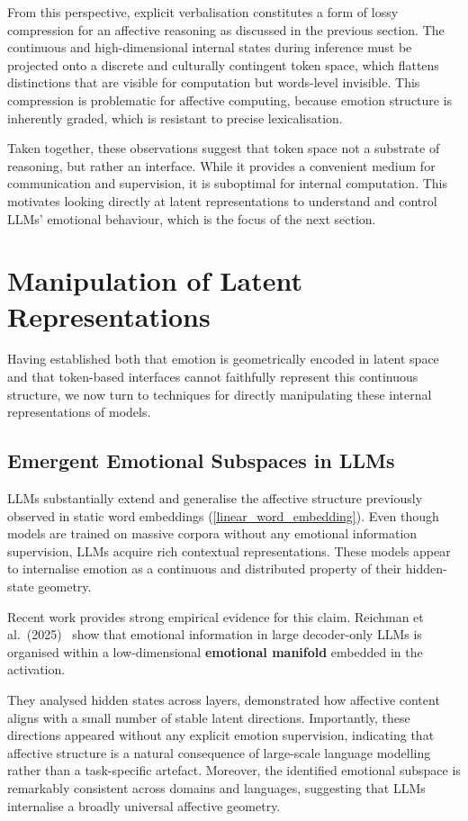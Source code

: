 From this perspective, explicit verbalisation constitutes a form of lossy compression for an affective reasoning as discussed in the previous section. The continuous and high-dimensional internal states during inference must be projected onto a discrete and culturally contingent token space, which flattens distinctions that are visible for computation but words-level invisible. This compression is problematic for affective computing, because emotion structure is inherently graded, which is resistant to precise lexicalisation.

Taken together, these observations suggest that token space not a substrate of reasoning, but rather an interface. While it provides a convenient medium for communication and supervision, it is suboptimal for internal computation. This motivates looking directly at latent representations to understand and control LLMs' emotional behaviour, which is the focus of the next section.

\section{Manipulation of Latent Representations}

Having established both that emotion is geometrically encoded in latent space and that token-based interfaces cannot faithfully represent this continuous structure, we now turn to techniques for directly manipulating these internal representations of models.

\subsection{Emergent Emotional Subspaces in LLMs}

LLMs substantially extend and generalise the affective structure previously observed in static word embeddings (\ref{linear_word_embedding}). Even though models are trained on massive corpora without any emotional information supervision, LLMs acquire rich contextual representations. These models appear to internalise emotion as a continuous and distributed property of their hidden-state geometry.

Recent work provides strong empirical evidence for this claim. Reichman et al.\ (2025)~\cite{reichman2025emotionsartthouunderstanding} show that emotional information in large decoder-only LLMs is organised within a low-dimensional \textbf{emotional manifold} embedded in the activation.

They analysed hidden states across layers, demonstrated how affective content aligns with a small number of stable latent directions. Importantly, these directions appeared without any explicit emotion supervision, indicating that affective structure is a natural consequence of large-scale language modelling rather than a task-specific artefact. Moreover, the identified emotional subspace is remarkably consistent across domains and languages, suggesting that LLMs internalise a broadly universal affective geometry.

